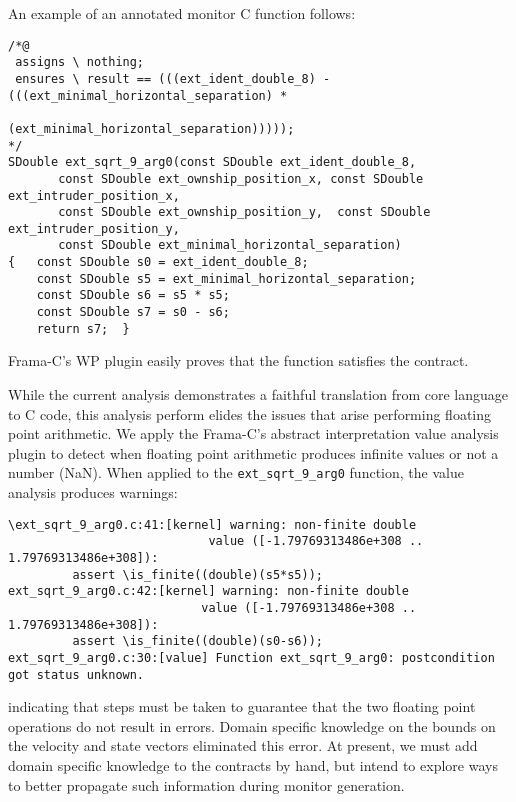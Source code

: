 An example of an annotated monitor C function follows: 

\begin{Verbatim}[fontsize=\scriptsize]
/*@
 assigns \ nothing;
 ensures \ result == (((ext_ident_double_8) - (((ext_minimal_horizontal_separation) *
                                 (ext_minimal_horizontal_separation)))));
*/
SDouble ext_sqrt_9_arg0(const SDouble ext_ident_double_8,
       const SDouble ext_ownship_position_x, const SDouble ext_intruder_position_x,
       const SDouble ext_ownship_position_y,  const SDouble ext_intruder_position_y,
       const SDouble ext_minimal_horizontal_separation)
{   const SDouble s0 = ext_ident_double_8;
    const SDouble s5 = ext_minimal_horizontal_separation;
    const SDouble s6 = s5 * s5;
    const SDouble s7 = s0 - s6;
    return s7;  }
\end{Verbatim}

\noindent
Frama-C's WP plugin easily proves that the function satisfies the
contract. 

While the current analysis demonstrates a faithful translation from
core language to C code, this analysis perform elides the issues that
arise performing floating point arithmetic. We apply the  Frama-C's abstract
interpretation value analysis plugin  to detect when floating point
arithmetic produces infinite values  or not a number (NaN).
When applied to the  \texttt{ext\_sqrt\_9\_arg0} function, the value
analysis produces warnings:
\begin{Verbatim}[fontsize=\scriptsize]
\ext_sqrt_9_arg0.c:41:[kernel] warning: non-finite double 
                            value ([-1.79769313486e+308 .. 1.79769313486e+308]):
         assert \is_finite((double)(s5*s5));
ext_sqrt_9_arg0.c:42:[kernel] warning: non-finite double
                           value ([-1.79769313486e+308 .. 1.79769313486e+308]):
         assert \is_finite((double)(s0-s6));
ext_sqrt_9_arg0.c:30:[value] Function ext_sqrt_9_arg0: postcondition got status unknown.
\end{Verbatim}
indicating that steps must be taken to guarantee  that the two floating
point operations do not result in errors.  Domain specific knowledge
on the  bounds on the velocity and state vectors  eliminated this
error.  At present, we must add domain specific knowledge to the
contracts by hand, but intend to explore ways to better propagate such
information during monitor generation.  

